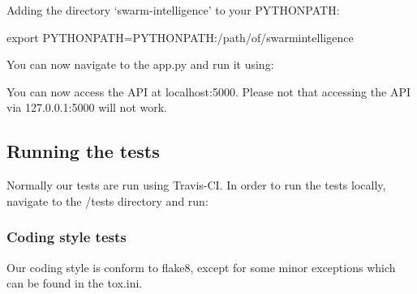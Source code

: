 \documentclass[letterpaper,10pt,english]{sphinxmanual}
\begin{document}
\begin{sphinxVerbatim}[commandchars=\\\{\}]
    
\end{sphinxVerbatim}

Adding the directory `swarm-intelligence' to your PYTHONPATH:

\begin{sphinxVerbatim}[commandchars=\\\{\}]
export PYTHONPATH=\PYGZdl{}PYTHONPATH:/path/of/swarm\PYGZhy{}intelligence
\end{sphinxVerbatim}

You can now navigate to the app.py and run it using:

\begin{sphinxVerbatim}[commandchars=\\\{\}]
 
 
\end{sphinxVerbatim}

You can now access the API at localhost:5000. Please not that accessing the API via 127.0.0.1:5000 will not work.


\subsection{Running the tests}
\label{\detokenize{installation:running-the-tests}}
Normally our tests are run using Travis-CI. In order to run the tests locally, navigate to the /tests directory and run:

\begin{sphinxVerbatim}[commandchars=\\\{\}]
\end{sphinxVerbatim}


\subsubsection{Coding style tests}
\label{\detokenize{installation:coding-style-tests}}
Our coding style is conform to flake8, except for some minor exceptions which can be found in the tox.ini.
\end{document}
